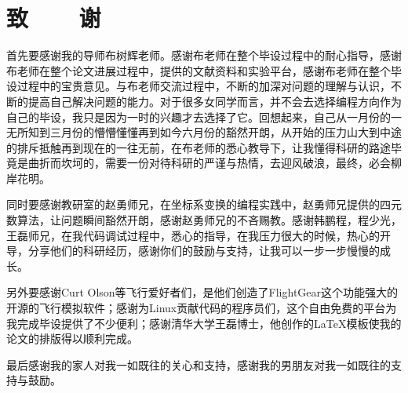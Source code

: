 ﻿%
%
%


%
%
\renewcommand{\baselinestretch}{1.5}
\fontsize{12pt}{13pt}\selectfont

\chapter*{致~~~~谢}
首先要感谢我的导师布树辉老师。感谢布老师在整个毕设过程中的耐心指导，感谢布老师在整个论文进展过程中，提供的文献资料和实验平台，感谢布老师在整个毕设过程中的宝贵意见。与布老师交流过程中，不断的加深对问题的理解与认识，不断的提高自己解决问题的能力。对于很多女同学而言，并不会去选择编程方向作为自己的毕设，我只是因为一时的兴趣才去选择了它。回想起来，自己从一月份的一无所知到三月份的懵懵懂懂再到如今六月份的豁然开朗，从开始的压力山大到中途的排斥抵触再到现在的一往无前，在布老师的悉心教导下，让我懂得科研的路途毕竟是曲折而坎坷的，需要一份对待科研的严谨与热情，去迎风破浪，最终，必会柳岸花明。

同时要感谢教研室的赵勇师兄，在坐标系变换的编程实践中，赵勇师兄提供的四元数算法，让问题瞬间豁然开朗，感谢赵勇师兄的不吝赐教。感谢韩鹏程，程少光，王磊师兄，在我代码调试过程中，悉心的指导，在我压力很大的时候，热心的开导，分享他们的科研经历，感谢你们的鼓励与支持，让我可以一步一步慢慢的成长。

另外要感谢Curt Olson等飞行爱好者们，是他们创造了FlightGear这个功能强大的开源的飞行模拟软件；感谢为Linux贡献代码的程序员们，这个自由免费的平台为我完成毕设提供了不少便利；感谢清华大学王磊博士，他创作的\LaTeX 模板使我的论文的排版得以顺利完成。

最后感谢我的家人对我一如既往的关心和支持，感谢我的男朋友对我一如既往的支持与鼓励。

